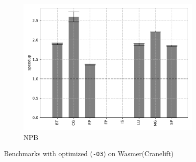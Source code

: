 \begin{figure}
\begin{subfigure}[t]{.45\textwidth}
        \includegraphics[width=\textwidth]
        {Images/6.1.RQ1/npb-wasmer-cranelift-opt.pdf}
        \caption{NPB}
    \end{subfigure}
    \caption{Benchmarks with optimized (\texttt{-O3}) on Wasmer(Cranelift)}
    \label{fig:rq1-wamer-cranelift-opt}
\end{figure}

